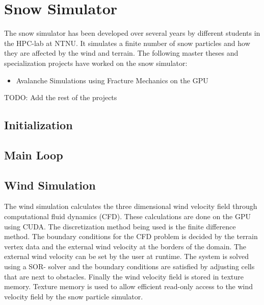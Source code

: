 \section{Snow Simulator}

The snow simulator has been developed over several years by different students in 
the HPC-lab at NTNU. It simulates a finite number of snow particles and how they 
are affected by the wind and terrain. The following master theses and specialization 
projects have worked on the snow simulator:

\begin{itemize}
	\item Avalanche Simulations using Fracture Mechanics on the GPU\cite{avalancheThesis}
\end{itemize}

TODO: Add the rest of the projects

\subsection{Initialization}

\subsection{Main Loop}

\subsection{Wind Simulation}

The wind simulation calculates the three dimensional wind velocity field through
computational fluid dynamics (CFD). These calculations are done on the GPU using
CUDA. The discretization method being used is the finite difference method. The
boundary conditions for the CFD problem is decided by the terrain vertex data
and the external wind velocity at the borders of the domain. The external wind
velocity can be set by the user at runtime. The system is solved using a SOR-
solver and the boundary conditions are satisfied by adjusting cells that are
next to obstacles. Finally the wind velocity field is stored in texture memory.
Texture memory is used to allow efficient read-only access to the wind velocity
field by the snow particle simulator.
